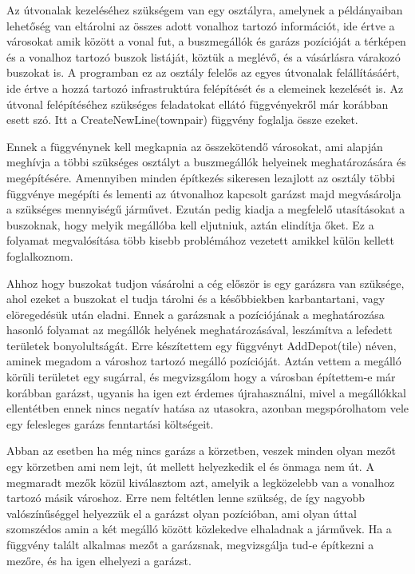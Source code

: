 Az útvonalak kezeléséhez szükségem van egy osztályra, amelynek a példányaiban lehetőség van eltárolni az összes adott vonalhoz tartozó információt, ide értve a városokat amik között a vonal fut, a buszmegállók és garázs pozícióját a térképen és a vonalhoz tartozó buszok listáját, köztük a meglévő, és a vásárlásra várakozó buszokat is. A programban ez az osztály felelős az egyes útvonalak felállításáért, ide értve a hozzá tartozó infrastruktúra felépítését és a elemeinek kezelését is. Az útvonal felépítéséhez szükséges feladatokat ellátó függvényekről már korábban esett szó. Itt a CreateNewLine(townpair) függvény foglalja össze ezeket.

Ennek a függvénynek kell megkapnia az összekötendő városokat, ami alapján meghívja a többi szükséges osztályt a buszmegállók helyeinek meghatározására és megépítésére. Amennyiben minden építkezés sikeresen lezajlott az osztály többi függvénye megépíti és lementi az útvonalhoz kapcsolt garázst majd megvásárolja a szükséges mennyiségű járművet. Ezután pedig kiadja a megfelelő utasításokat a buszoknak, hogy melyik megállóba kell eljutniuk, aztán elindítja őket. Ez a folyamat megvalósítása több kisebb problémához vezetett amikkel külön kellett foglalkoznom.

Ahhoz hogy buszokat tudjon vásárolni a cég először is egy garázsra van szüksége, ahol ezeket a buszokat el tudja tárolni és a későbbiekben karbantartani, vagy elöregedésük után eladni. Ennek a garázsnak a pozíciójának a meghatározása hasonló folyamat az megállók helyének meghatározásával, leszámítva a lefedett területek bonyolultságát. Erre készítettem egy függvényt AddDepot(tile) néven, aminek megadom a városhoz tartozó megálló pozícióját. Aztán vettem a megálló körüli területet egy sugárral, és megvizsgálom hogy a városban építettem-e már korábban garázst, ugyanis ha igen ezt érdemes újrahasználni, mivel a megállókkal ellentétben ennek nincs negatív hatása az utasokra, azonban megspórolhatom vele egy felesleges garázs fenntartási költségeit.

Abban az esetben ha még nincs garázs a körzetben, veszek minden olyan mezőt egy körzetben ami nem lejt, út mellett helyezkedik el és önmaga nem út. A megmaradt mezők közül kiválasztom azt, amelyik a legközelebb van a vonalhoz tartozó másik városhoz. Erre nem feltétlen lenne szükség, de így nagyobb valószínűséggel helyezzük el a garázst olyan pozícióban, ami olyan úttal szomszédos amin a két megálló között közlekedve elhaladnak a járművek. Ha a függvény talált alkalmas mezőt a garázsnak, megvizsgálja tud-e építkezni a mezőre, és ha igen elhelyezi a garázst.

